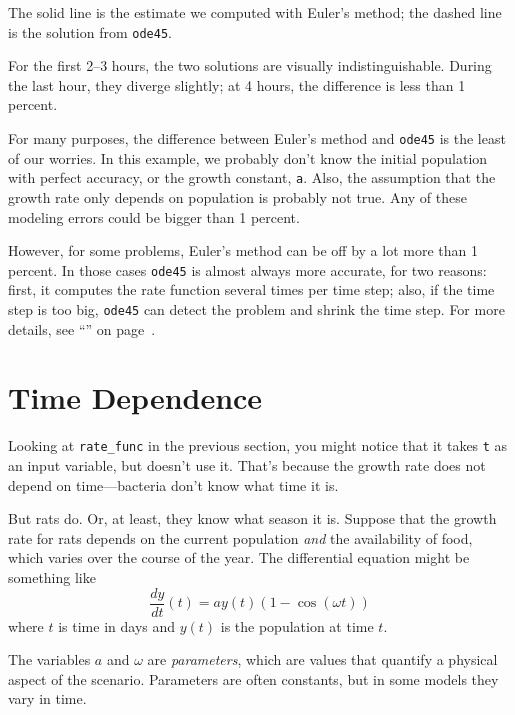 The solid line is the estimate we computed with Euler's method; the dashed line is the solution from \lstinline{ode45}.

For the first 2--3 hours, the two solutions are visually indistinguishable.  During the last hour, they diverge slightly; at 4 hours, the difference is less than 1 percent.

For many purposes, the difference between Euler's method and \lstinline{ode45} is the least of our worries.  In this example, we probably don't know the initial population with perfect accuracy, or the growth constant, \lstinline{a}.  Also, the assumption that the growth rate only depends on population is probably not true.  Any of these modeling errors could be bigger than 1 percent.

However, for some problems, Euler's method can be off by a lot more than 1 percent.  
In those cases \lstinline{ode45} is almost always more accurate, for two reasons: first, it computes the rate function several times per time step; also, if the time step is too big, \lstinline{ode45} can detect the problem and shrink the time step.  For more details, see ``'' on page~\pageref{howode45}.


\section{Time Dependence}

Looking at \lstinline{rate_func} in the previous section, you might notice that it takes \lstinline{t} as an input variable, but doesn't use it.  That's because the growth rate does not depend on time---bacteria don't know what time it is.


But rats do.  Or, at least, they know what season it is.
Suppose that the growth rate for rats depends on the current population \emph{and} the availability of food, which varies over the course of the year.
The differential equation might be something like
%
\begin{equation*}
\frac{dy}{dt}(t) = a y(t) \left(1 - \cos (\omega t) \right)
\end{equation*}
%
where $t$ is time in days and $y(t)$ is the population at time $t$.

The variables $a$ and $\omega$ are \emph{parameters}, which are values that
quantify a physical aspect of the scenario.  Parameters are often constants, but in some models they vary in time.

